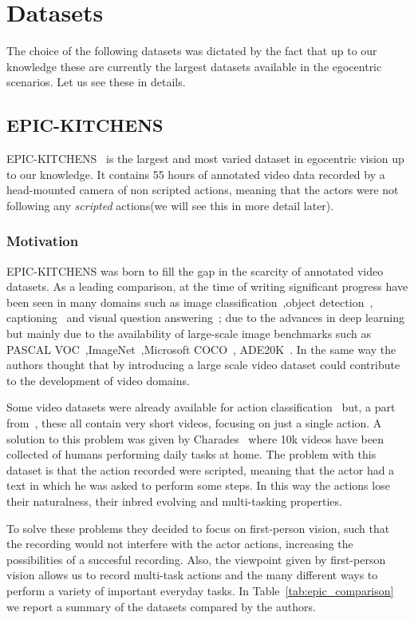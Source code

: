 \chapter{Datasets}
The choice of the following datasets was dictated by the fact that up to our knowledge these are 
currently the largest datasets available in the egocentric scenarios. Let us see these in details.

\section{EPIC-KITCHENS}\label{sec:EK}
EPIC-KITCHENS~\cite{EPICKITCHENS} is the largest and most varied dataset in egocentric vision up to our knowledge.
It contains 55 hours of annotated video data recorded by a head-mounted camera of non scripted actions, 
meaning that the actors were not following any \textit{scripted} actions(we will see this in more detail
later).
\subsection{Motivation}
EPIC-KITCHENS was born to fill the gap in the scarcity of annotated video datasets.
As a leading comparison, at the time of writing significant progress have been seen in many domains
such as image classification~\cite{residualImage},object detection~\cite{fasterRCNN},
captioning~\cite{captioning} and visual question answering~\cite{vqa}; due to the advances in deep
learning but mainly due to the availability of large-scale image benchmarks 
such as PASCAL VOC~\cite{pascalImage},ImageNet~\cite{imagenet},Microsoft COCO~\cite{COCO},
ADE20K~\cite{ADE20K}. In the same way the authors thought that by introducing
a large scale video dataset could contribute to the development 
of video domains.

Some video datasets were already available for action classification~\cite{somethingSomething,yt,movieBench,movieQA,vlogs}
but, a part from~\cite{movieQA}, these all contain very short videos, focusing on just
a single action. A solution to this problem was given by Charades~\cite{charades} where 10k
videos have been collected of humans performing daily tasks at home.
The problem with this dataset is that the action recorded were scripted,
meaning that the actor had a text in which he was asked to perform some steps.
In this way the actions lose their naturalness, their inbred evolving 
and multi-tasking properties.

To solve these problems they decided to focus on first-person vision, such that
the recording would not interfere with the actor actions, increasing the 
possibilities of a succesful recording. Also, the viewpoint given by 
first-person vision allows us to record multi-task actions and the many different
ways to perform a variety of important everyday tasks. In Table~\ref{tab:epic_comparison}
we report a summary of the datasets compared by the authors.

